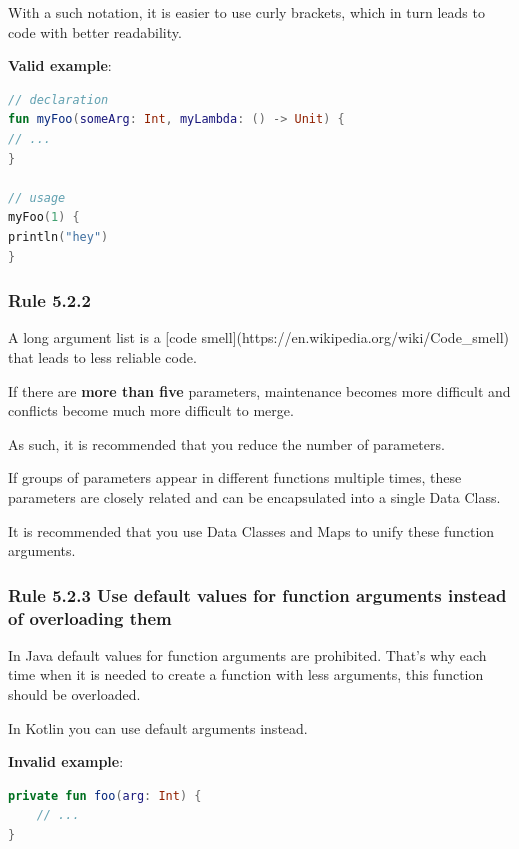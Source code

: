 {{{{With a such notation, it is easier to use curly brackets, which in turn leads to code with better readability.



\textbf{Valid example}:

\begin{lstlisting}[language=Kotlin]
// declaration
fun myFoo(someArg: Int, myLambda: () -> Unit) {
// ...
}

// usage
myFoo(1) { 
println("hey")
}
\end{lstlisting}


\subsubsection*{\textbf{Rule 5.2.2}}
\leavevmode\newline



A long argument list is a [code smell](https://en.wikipedia.org/wiki/Code\_smell) that leads to less reliable code.

If there are \textbf{more than five} parameters, maintenance becomes more difficult and conflicts become much more difficult to merge.

As such, it is recommended that you reduce the number of parameters.

If groups of parameters appear in different functions multiple times, these parameters are closely related and can be encapsulated into a single Data Class.

It is recommended that you use Data Classes and Maps to unify these function arguments.



\subsubsection*{\textbf{Rule 5.2.3 Use default values for function arguments instead of overloading them}}
\leavevmode\newline

In Java default values for function arguments are prohibited. That's why each time when it is needed to create a function with less arguments, this function should be overloaded.

In Kotlin you can use default arguments instead.



\textbf{Invalid example}:

\begin{lstlisting}[language=Kotlin]
private fun foo(arg: Int) {
    // ...
}


\end{lstlisting}}}}}
